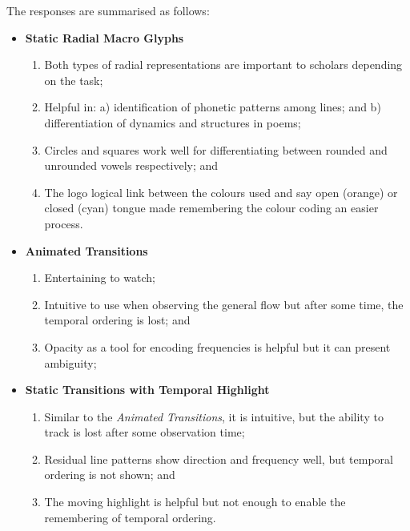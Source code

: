 The responses are summarised as follows:
\begin{itemize}
\item \textbf{Static Radial Macro Glyphs}
\vspace{-1mm}
\begin{enumerate}
\item Both types of radial representations are important to scholars depending on the task;
\vspace{-2mm}
\item Helpful in: a) identification of phonetic patterns among lines; and b) differentiation of dynamics and structures in poems;
\vspace{-2mm}
\item Circles and squares work well for differentiating between rounded and unrounded vowels respectively; and
\vspace{-2mm}
\item The logo logical link between the colours used and say open (orange) or closed (cyan) tongue made remembering the colour coding an easier process.
\end{enumerate}
\vspace{-2mm}
\item \textbf{Animated Transitions}
\vspace{-1mm}
\begin{enumerate}
\item Entertaining to watch;
\vspace{-2mm}
\item Intuitive to use when observing the general flow but after some time, the temporal ordering is lost; and
\vspace{-2mm}
\item Opacity as a tool for encoding frequencies is helpful but it can present ambiguity;
\end{enumerate}
\vspace{-2mm}
\item \textbf{Static Transitions with Temporal Highlight}
\vspace{-1mm}
\begin{enumerate}
\vspace{-2mm}
\item Similar to the \emph{Animated Transitions}, it is intuitive, but the ability to track is lost after some observation time;
\vspace{-2mm}
\item Residual line patterns show direction and frequency well, but temporal ordering is not shown; and
\vspace{-2mm}
\item The moving highlight is helpful but not enough to enable the remembering of temporal ordering.
\vspace{-2mm}
\end{enumerate}
\end{itemize}

